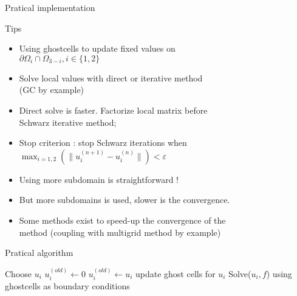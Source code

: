 \documentclass[compress,10pt,aspectratio=169]{beamer}
\begin{document}
\begin{frame}[fragile]{Pratical implementation}
  \scriptsize
  \begin{multicols}{2}
  \begin{block}{\small Tips}
    \begin{itemize}
      \item Using ghostcells to update fixed values on\\ $\partial\Omega_{i} \cap \Omega_{3-i}, i\in\{1,2\}$
      \item Solve local values with direct or iterative method\\ (GC by example)
      \item Direct solve is faster. Factorize local matrix before\\ Schwarz iterative method;
      \item Stop criterion : stop Schwarz iterations when \\
      $\displaystyle\max_{i=1,2}\left(\|u_{i}^{(n+1)} - u_{i}^{(n)}\|\right) < \varepsilon$
      \item Using more subdomain is straightforward !
      \item But more subdomains is used, slower is the convergence.
      \item Some methods exist to speed-up the convergence of the\\ method (coupling with multigrid method by example)
    \end{itemize}
  \end{block}

  \begin{exampleblock}{\small Pratical algorithm}
    \begin{algorithm}[H]
      Choose $u_{i}$\;
      $u_{i}^{(old)} \leftarrow 0$\;
       {
          $u_{i}^{(old)} \leftarrow u_{i}$\;
          update ghost cells for $u_{i}$\;
          Solve($u_{i}, f$) using ghostcells as boundary conditions\;
      }
    \end{algorithm}
  \end{exampleblock}
\end{multicols}
\end{frame}
\end{document}
